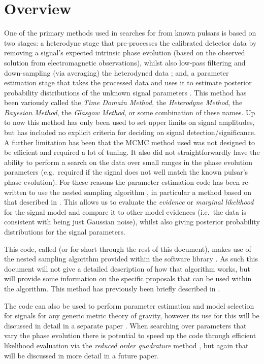\section{Overview}

One of the primary methods used in searches for \gws from known pulsars is based on two stages: a heterodyne
stage that pre-processes the calibrated \gw detector data by removing a signal's expected intrinsic phase
evolution (based on the observed solution from electromagnetic observations), whilst also low-pass filtering and
down-sampling (via averaging) the heterodyned data \citep{2005PhRvD..72j2002D}; and, a parameter estimation stage that takes the
processed data and uses it to estimate posterior probability distributions of the unknown signal parameters
\citep[e.g.\ using a Markov chain Monte Carlo (MCMC)][]{2010ApJ...713..671A}. This method has been variously
called the {\it Time Domain Method}, the {\it Heterodyne Method}, the {\it Bayesian Method}, the {\it Glasgow
Method}, or some combination of these names. Up to now this method has only been used to set upper limits
on signal amplitudes, but has included no explicit criteria for deciding on signal detection/significance. A further
limitation has been that the MCMC method used was not designed to be efficient and required a lot of tuning. It also
did not straightforwardly have the ability to perform a search on the data over small ranges in the phase
evolution parameters (e.g.\ required if the
\gw signal does not well match the known pulsar's phase evolution). For these reasons the parameter
estimation code has been re-written to use the nested sampling algorithm \citep{Skilling:2006}, in particular
a method based on that described in \citet{Veitch:2010}. This allows us to evaluate the {\it evidence} or {\it
marginal likelihood} for the signal model and compare it to other model evidences (i.e.\ the data is consistent with being just
Gaussian noise), whilst also giving posterior probability distributions for the signal parameters.

This code, called \lppenf (or \lppen for short through the rest of this document), makes use of the nested sampling
algorithm provided within the \lalinf software library \citep{2015PhRvD..91d2003V}. As such this document will not
give a detailed description of how that algorithm works, but will provide some information on the specific proposals
that can be used within the algorithm. This method has previously been briefly described in \citet{2012JPhCS.363a2041P}.

The code can also be used to perform parameter estimation and model selection for signals for any generic
metric theory of gravity, however its use for this will be discussed in detail in a separate paper \citep{MaxCWpolariations}. When
searching over parameters that vary the phase evolution there is potential to speed up the code through
efficient likelihood evaluation via the {\it reduced order quadrature} method \citep[see, e.g.,][]{2014PhRvX...4c1006F,2015PhRvL.114g1104C},
but again that will be discussed in more detail in a future paper.


